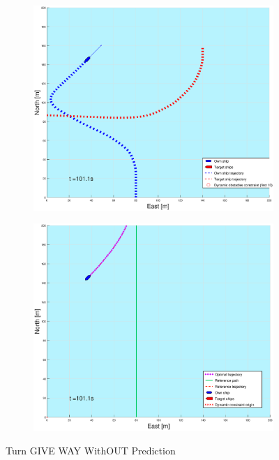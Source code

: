 \begin{figure}[ht]
\begin{subfigure}[b]{0.499\textwidth}
    \end{subfigure}
    \hfill
    \\
    \begin{subfigure}[b]{0.49\textwidth}
        \centering
        \includegraphics[width=\textwidth]{Images/Figures/sving_GW/_Simple_1fig1_time=101}
    \end{subfigure}
    \hfill
    \begin{subfigure}[b]{0.499\textwidth}
        \centering
        \includegraphics[width=\textwidth]{Images/Figures/sving_GW/_Simple_1fig999_time=101}
    \end{subfigure}
    \hfill
    \caption{Turn GIVE WAY WithOUT Prediction}
\end{figure}

